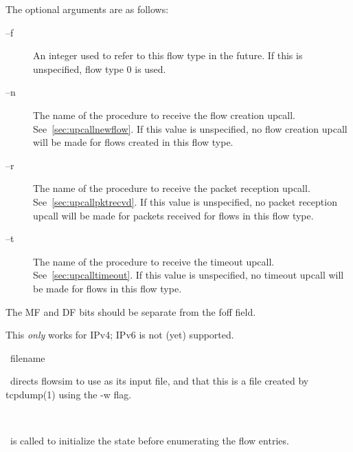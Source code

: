 \documentclass{article}
\begin{document}
The optional arguments are as follows:

\begin{description}
\item[--f] An integer used to refer to this flow type in the future.
If this is unspecified, flow type 0 is used.
\item[--n] The name of the procedure to receive the flow creation
upcall.  See~\ref{sec:upcallnewflow}.  If
this value is unspecified, no flow creation upcall will be made for
flows created in this flow type.
\item[--r] The name of the procedure to receive the packet reception
upcall.  See~\ref{sec:upcallpktrecvd}.  If this value is unspecified,
no packet reception upcall will be made for packets received for flows
in this flow type.
\item[--t] The name of the procedure to receive the timeout upcall.
See~\ref{sec:upcalltimeout}.  If this value is unspecified,
no timeout upcall will be made for flows in this flow type.
\end{description}

\BUGS

The MF and DF bits should be separate from the foff field.

This \emph{only} works for IPv4; IPv6 is not (yet) supported.

\manend


\SYNOPSIS \cmdname\ filename

\DESCRIPTION

\cmdname\ directs flowsim to use  as
its input file, and that this is a file created by tcpdump(1) using the
-w flag.

\SEEALSO


\manend


\SYNOPSIS \cmdname\

\DESCRIPTION

\cmdname\ is called to initialize the state before enumerating the flow
entries.

\SEEALSO


\manend


\SYNOPSIS \cmdname\

\DESCRIPTION
\end{document}
